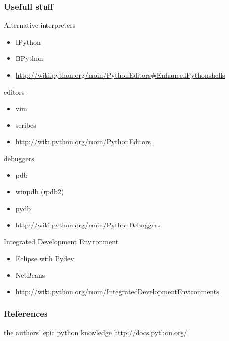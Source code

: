 \documentclass{beamer}
\begin{document}
\begin{frame}[allowframebreaks]
	\frametitle{Usefull stuff}
	
	\begin{block}{Alternative interpreters}
	\begin{itemize}
		\item IPython
		\item BPython
		\item \url{http://wiki.python.org/moin/PythonEditors\#EnhancedPythonshells}
	\end{itemize}
	\end{block}

	\begin{block}{editors}
	\begin{itemize}
		\item vim
		\item scribes
		\item \url{http://wiki.python.org/moin/PythonEditors}
	\end{itemize}
	\end{block}

\framebreak

	\begin{block}{debuggers}
	\begin{itemize}
		\item pdb
		\item winpdb (rpdb2)
		\item pydb
		\item \url{http://wiki.python.org/moin/PythonDebuggers}
	\end{itemize}
	\end{block}
	
	\begin{block}{Integrated Development Environment}
	\begin{itemize}
		\item Eclipse with Pydev
		\item NetBeans
		\item \url{http://wiki.python.org/moin/IntegratedDevelopmentEnvironments}
	\end{itemize}
	\end{block}
\end{frame}

\begin{frame}
	\frametitle{References}
	\begin{thebibliography}{3}
	 the authors' epic python knowledge
	 \url{http://docs.python.org/}
	\end{thebibliography}
\end{frame}
\end{document}
